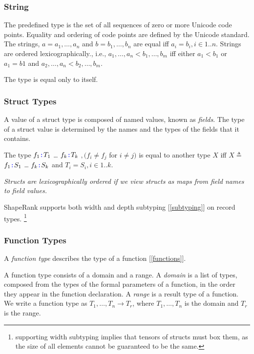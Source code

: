 \documentclass{article}
\begin{document}
\subsubsection{String}
\label{string}

The predefined type \STRING{} is the set of all sequences of zero or more Unicode code points. Equality and ordering of code points are defined by the Unicode standard. 
The strings, $a = a_1, \ldots, a_n$ and $b = b_1, \ldots, b_n$ are equal iff $a_i = b_i, i \in 1..n$. Strings are ordered lexicographically., i.e., $a_1, \ldots, a_n < b_1, \ldots, b_m$ iff  either $a_1 < b_1$ or $a_1 = b1$ and $a_2, \ldots, a_n < b_2, \ldots, b_m$.

The type \STRING{} is equal only to itself. 

\subsubsection{Struct Types}
\label{structTypes}

A value of a struct type is composed of named values, known as {\em fields}. The type of a struct value is determined by the names and the types of the fields that it contains.

\StructType{}

\PropertySig{}

The type \LCURLY{}$f_1 \texttt{\color{blue} :}{} T_1$\COMMA{} \ldots\COMMA{}  $f_k \texttt{\color{blue} :}{} T_k$\RCURLY{} $, (f_i \ne f_j$ for $i \ne j)$ is equal to another type $X$ iff  $X \triangleq $ \LCURLY{}$f_1 \texttt{\color{blue} :}{} S_1$\COMMA{} \ldots\COMMA{}  $f_k \texttt{\color{blue} :}{} S_k$\RCURLY{} and $T_i = S_i, i \in 1..k$.


{\em
Structs are lexicographically ordered if we view structs as maps from field names to field values. 
}

ShapeRank supports both width and depth subtyping [\ref{subtyping}] on record types. \footnote{supporting width subtyping implies that tensors of structs must box them, as the size of all elements cannot be guaranteed to be the same.} 

\subsubsection{Function Types}
\label{functionTypes}

A {\em function type} describes the type of a function [\ref{functions}].

A function type consists of a domain and a range. A {\em domain} is a list of types, composed from the types of the formal parameters of a function, in the order they appear in the function declaration. A {\em range} is a result type of a function. 
We write a  function type as $T_1, \ldots, T_n \to T_r$, where $T_1, \ldots, T_n$ is the domain and $T_r$ is the range.
\end{document}
